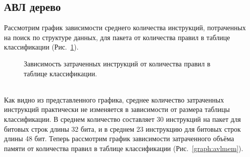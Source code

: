 \documentclass[conference]{IEEEtran}
\begin{document}
        \subsection{АВЛ дерево}
            Рассмотрим график зависимости среднего количества инструкций, потраченных на поиск по структуре данных, для пакета от количества правил в таблице классификации (Рис.~\ref{graph:avlinst}).
            \begin{figure}[ht]
                \centering
                \captionsetup{justification=centering}
                \caption{Зависимость затраченных инструкций от количества правил в таблице классификации.}
                \label{graph:avlinst}
            \end{figure}
            \\
            Как видно из представленного графика, среднее количество затраченных инструкций практически не изменяется в зависимости от размера таблицы классификации. 
            В среднем количество составляет 30 инструкций на пакет для битовых строк длины 32 бита, и в среднем 23 инструкцию для битовых строк длины 48 бит.
            Теперь рассмотрим график зависимости затраченного объёма памяти от количества правил в таблице классификации (Рис.~\ref{graph:avlmem}).
            \\
\end{document}
